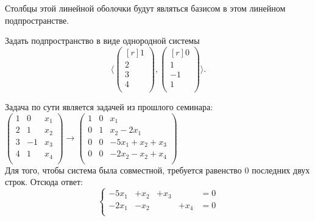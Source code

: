 Столбцы этой линейной оболочки будут являться базисом в этом линейном подпространстве.
\begin{prim}
	Задать подпространство в виде однородной системы
	$$
	\langle 
	\begin{pmatrix*}[r]
	1\\
	2\\
	3\\
	4\\
	\end{pmatrix*}
	,
	\begin{pmatrix*}[r]
	0\\
	1\\
	-1\\
	1\\
	\end{pmatrix*}
	\rangle .
	$$
\end{prim}
Задача по сути является задачей из прошлого семинара:\\
$
\left(
\begin{array}{rr|r}
1 & 0 & x_1\\
2 & 1 & x_2\\
3 & -1 & x_3\\
4 & 1 & x_4\\
\end{array}
\right)
\rightarrow
\left(
\begin{array}{cc|c}
1 & 0 & x_1\\
0 & 1 & x_2-2x_1\\
0 & 0 & -5x_1+x_2+x_3\\
0 & 0 & -2x_2-x_2+x_4\\
\end{array}
\right)
$\\
Для того, чтобы система была совместной, требуется равенство 0 последних двух строк. Отсюда ответ:
$$
\left\{
\begin{array}{rrrrl}
-5x_1&+x_2&+x_3&&=0\\
-2x_1&-x_2&&+x_4&=0\\
\end{array}
\right.
$$